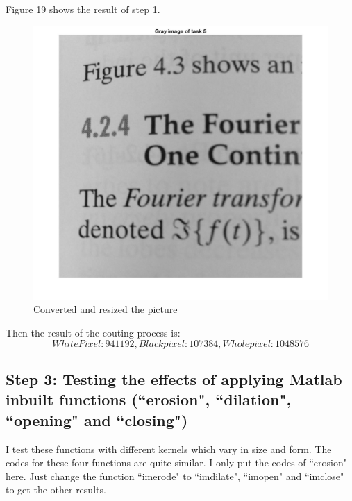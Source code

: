 \documentclass{article}
\begin{document}
Figure 19 shows the result of step 1.

\begin{figure}[htbp]
    \centering
    \includegraphics[scale = 0.15]{fig16.jpg}
    \caption{Converted and resized the picture}
    \label{fig16}
\end{figure}

Then the result of the couting process is:
$$White Pixel: 941192, Black pixel: 107384, Whole pixel: 1048576$$

\subsection*{Step 3: Testing the effects of applying Matlab inbuilt functions (``erosion", ``dilation", ``opening" and ``closing")}

I test these functions with different kernels which vary in size and form. The codes for these four functions are quite similar. I only put the codes of ``erosion" here. Just change the function ``imerode" to ``imdilate", ``imopen" and ``imclose" to get the other results.
\end{document}
